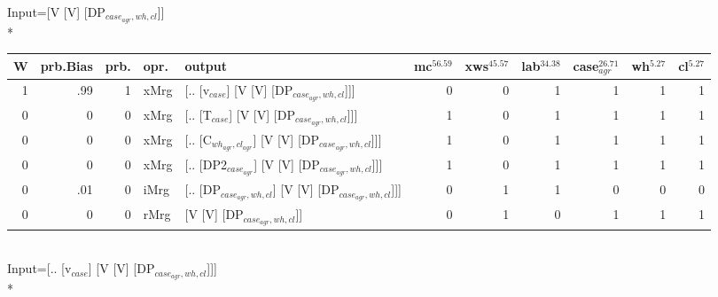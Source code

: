 \begingroup\scriptsize Input=[V [V] [DP$_{case_{agr},wh,cl}$]]\\*
\begin{tabularx}{\linewidth}{rrrlXrrrrrr}
\hline
   W &   prb.Bias &   prb. & opr.   & output                                               &   mc$^{56.59}$ &   xws$^{45.57}$ &   lab$^{34.38}$ &   case$_{agr}^{26.71}$ &   wh$^{5.27}$ &   cl$^{5.27}$ \\
\hline
   1 &       .99 &   1 & xMrg & [.. [v$_{case}$] [V [V] [DP$_{case_{agr},wh,cl}$]]]            &            0 &             0 &             1 &                  1 &           1 &           1 \\
   0 &       0 &   0 & xMrg & [.. [T$_{case}$] [V [V] [DP$_{case_{agr},wh,cl}$]]]            &            1 &             0 &             1 &                  1 &           1 &           1 \\
   0 &       0 &   0 & xMrg & [.. [C$_{wh_{agr},cl_{agr}}$] [V [V] [DP$_{case_{agr},wh,cl}$]]]   &            1 &             0 &             1 &                  1 &           1 &           1 \\
   0 &       0 &   0 & xMrg & [.. [DP2$_{case_{agr}}$] [V [V] [DP$_{case_{agr},wh,cl}$]]]      &            1 &             0 &             1 &                  1 &           1 &           1 \\
   0 &       .01 &   0 & iMrg & [.. [DP$_{case_{agr},wh,cl}$] [V [V] [DP$_{case_{agr},wh,cl}$]]] &            0 &             1 &             1 &                  0 &           0 &           0 \\
   0 &       0 &   0 & rMrg & [V [V] [DP$_{case_{agr},wh,cl}$]]                          &            0 &             1 &             0 &                  1 &           1 &           1 \\
\hline
\end{tabularx}\endgroup\\
\begingroup\scriptsize Input=[.. [v$_{case}$] [V [V] [DP$_{case_{agr},wh,cl}$]]]\\*

